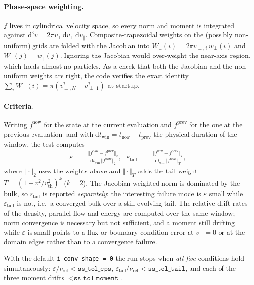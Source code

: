\documentclass[11pt,a4paper]{article}
\newcommand{\vp}{v_\perp}
\newcommand{\vpa}{v_\parallel}
\begin{document}
\paragraph{Phase-space weighting.}  $f$ lives in cylindrical velocity space, so
every norm and moment is integrated against $\mathrm{d}^3v = 2\pi\vp\,
\mathrm{d}\vp\,\mathrm{d}\vpa$.  Composite-trapezoidal weights on the (possibly
non-uniform) grids are folded with the Jacobian into $W_\perp(i) =
2\pi v_{\perp,i}\, w_\perp(i)$ and $W_\parallel(j) = w_\parallel(j)$.  Ignoring
the Jacobian would over-weight the near-axis region, which holds almost no
particles.  As a check that both the Jacobian and the non-uniform weights are
right, the code verifies the exact identity
$\sum_i W_\perp(i) = \pi(v_{\perp,N}^2 - v_{\perp,1}^2)$ at startup.

\paragraph{Criteria.}  Writing $f^\mathrm{now}$ for the state at the current
evaluation and $f^\mathrm{prev}$ for the one at the previous evaluation, and
with $\mathrm{d}t_\mathrm{win} = t_\mathrm{now} - t_\mathrm{prev}$ the physical
duration of the window, the test computes
\begin{align}
  \varepsilon      &= \frac{\Vert f^\mathrm{now} - f^\mathrm{prev}\Vert_2}
                           {\mathrm{d}t_\mathrm{win}\,\Vert f^\mathrm{now}\Vert_2}, &
  \varepsilon_\mathrm{tail} &= \frac{\Vert f^\mathrm{now} - f^\mathrm{prev}\Vert_T}
                           {\mathrm{d}t_\mathrm{win}\,\Vert f^\mathrm{now}\Vert_T},
  \label{eq:epsconv}
\end{align}
where $\Vert\cdot\Vert_2$ uses the weights above and $\Vert\cdot\Vert_T$ adds the
tail weight $T = (1 + v^2/v_\mathrm{th}^2)^{k}$ ($k=2$).  The Jacobian-weighted
norm is dominated by the bulk, so $\varepsilon_\mathrm{tail}$ is reported
\emph{separately}: the interesting failure mode is $\varepsilon$ small while
$\varepsilon_\mathrm{tail}$ is not, i.e.\ a converged bulk over a still-evolving
tail.  The relative drift rates of the density, parallel flow and energy are
computed over the same window; norm convergence is necessary but not sufficient,
and a moment still drifting while $\varepsilon$ is small points to a flux or
boundary-condition error at $\vp=0$ or at the domain edges rather than to a
convergence failure.

With the default \texttt{i\_conv\_shape = 0} the run stops when \emph{all five}
conditions hold simultaneously:
$\varepsilon/\nu_\mathrm{ref} < \texttt{ss\_tol\_eps}$,
$\varepsilon_\mathrm{tail}/\nu_\mathrm{ref} < \texttt{ss\_tol\_tail}$, and each
of the three moment drifts $< \texttt{ss\_tol\_moment}$.
\end{document}
